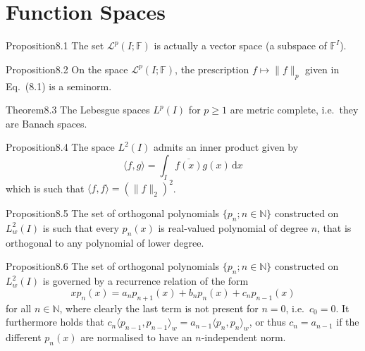 \section{Function Spaces}

\begin{res}{Proposition}{8.1}
The set $\mathcal L^p(I;\mathbb F)$ is actually a vector space (a subspace of $\mathbb F^I$).
\end{res}

\begin{res}{Proposition}{8.2}
On the space $\mathcal L^p(I;\mathbb F)$, the prescription $f\mapsto\|f\|_p$ given in Eq.~(8.1) is a seminorm.
\end{res}

\begin{res}{Theorem}{8.3}
The Lebesgue spaces $L^p(I)$ for $p\ge1$ are metric complete, i.e.\ they are Banach spaces.
\end{res}

\begin{res}{Proposition}{8.4}
The space $L^2(I)$ admits an inner product given by
\begin{equation}\langle f,g\rangle=\int_I\overline{f(x)}g(x)\,\mathrm dx\tag{8.12}\end{equation}
which is such that $\langle f,f\rangle=(\|f\|_2)^2$.
\end{res}

\begin{res}{Proposition}{8.5}
The set of orthogonal polynomials $\{p_n;n\in\mathbb N\}$ constructed on $L^2_w(I)$ is such that every $p_n(x)$ is real-valued polynomial of degree $n$, that is orthogonal to any polynomial of lower degree.
\end{res}

\begin{res}{Proposition}{8.6}
The set of orthogonal polynomials $\{p_n;n\in\mathbb N\}$ constructed on $L^2_w(I)$ is governed by a recurrence relation of the form
\begin{equation}xp_n(x)=a_np_{n+1}(x)+b_np_n(x)+c_np_{n-1}(x)\tag{8.15}\end{equation}
for all $n\in\mathbb N$, where clearly the last term is not present for $n=0$, i.e.\ $c_0=0$. It furthermore holds that $c_n\langle p_{n-1},p_{n-1}\rangle_w=a_{n-1}\langle p_n,p_n\rangle_w$, or thus $c_n=a_{n-1}$ if the different $p_n(x)$ are normalised to have an $n$-independent norm.
\end{res}

